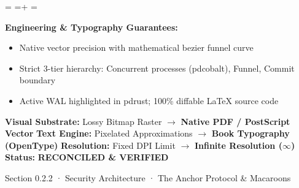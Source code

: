 \documentclass[10pt,a4paper,landscape]{article}
\newcommand{\pdautoscale}[2]{%
  \pdmaxh=#1\relax
  \pdmaxw=#2\relax
  \sbox{\pdscaledbox}{\usebox{\pdfigbox}}%
  \pdcurh=\dimexpr\ht\pdscaledbox+\dp\pdscaledbox\relax
  \pdcurw=\wd\pdscaledbox
  \ifdim\dimexpr\pdcurw * 100 / \pdmaxw\relax > \dimexpr\pdcurh * 100 / \pdmaxh\relax
    \resizebox{\pdmaxw}{!}{\usebox{\pdscaledbox}}%
  \else
    \resizebox{!}{\pdmaxh}{\usebox{\pdscaledbox}}%
  \fi
}
\begin{document}
\begin{minipage}[t]{0.492\linewidth}
  \begin{tcolorbox}[
    colback=pdcobalt!3,colframe=pdcobalt!85!black,arc=1.5pt,
    boxrule=0.7pt,top=1.5pt,bottom=1.5pt,left=4pt,right=4pt,
    title={\pdgrotesk\footnotesize\bfseries \color{white} B. Authoritative Native Vector Replacement \hfill \texttt{.tex / TikZ / PGF}}
  ]
    \begin{minipage}[c][8.3cm][c]{\linewidth}
      \centering
      \sbox{\pdfigbox}{}
      \pdautoscale{8.0cm}{\linewidth}
    \end{minipage}
    \tcblower
    \begin{minipage}[t][2.0cm][t]{\linewidth}
      \pdgrotesk\scriptsize
      \textbf{{\color{pdcobalt} Engineering \& Typography Guarantees:}}\\
      \begin{itemize}[leftmargin=9pt,itemsep=0pt,topsep=0.5pt,parsep=0pt]
        \item Native vector precision with mathematical bezier funnel curve
        \item Strict 3-tier hierarchy: Concurrent processes (pdcobalt), Funnel, Commit boundary
        \item Active WAL highlighted in pdrust; 100\% diffable LaTeX source code
      \end{itemize}
    \end{minipage}
  \end{tcolorbox}
\end{minipage}

\vspace*{0.05cm}
\noindent
\begin{tcolorbox}[
  colback=hhpaper,colframe=hhgray!35,arc=1.5pt,boxrule=0.4pt,
  top=1.5pt,bottom=1.5pt,left=6pt,right=6pt
]
  \pdgrotesk\scriptsize
  \noindent
  \textbf{Visual Substrate:} Lossy Bitmap Raster $\rightarrow$ \textbf{\color{pdcobalt}Native PDF / PostScript Vector}\hfill
  \textbf{Text Engine:} Pixelated Approximations $\rightarrow$ \textbf{\color{pdcobalt}Book Typography (OpenType)}\hfill
  \textbf{Resolution:} Fixed DPI Limit $\rightarrow$ \textbf{\color{pdcobalt}Infinite Resolution ($\infty$)}\hfill
  \textbf{Status:} \textbf{\color{pdteal}RECONCILED \& VERIFIED}
\end{tcolorbox}
\clearpage

\noindent
\begin{minipage}[t]{\linewidth}
  \hfill
  {\pdgrotesk\footnotesize\color{hhgray} Section 0.2.2 · Security Architecture · The Anchor Protocol \& Macaroons}\\
  \vspace*{0.03cm}
  \noindent{\color{hhgray!40}\rule{\linewidth}{0.5pt}}
\end{minipage}
\end{document}
